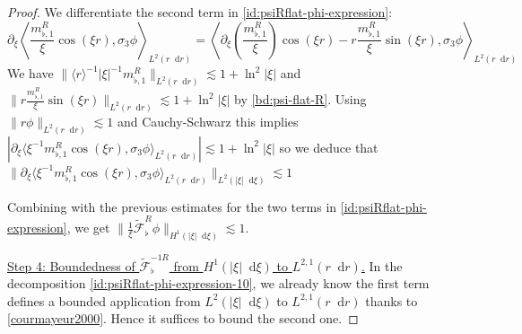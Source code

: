\documentclass[11 pt]{amsart}
\theoremstyle{definition}
\theoremstyle{remark}
\numberwithin{equation}{section}
\newcommand{\dd}{\mathop{}\!\mathrm{d}}
\begin{document}
\begin{proof}
We differentiate the second term in \eqref{id:psiRflat-phi-expression}:
$$
\partial_\xi \left\langle \frac{m_{\flat, 1}^R }{\xi} \cos (\xi r),\sigma_3 \phi\right\rangle_{L^2(r\dd r)}=\left\langle \partial_\xi \left( \frac{m_{\flat, 1}^R }{\xi}\right) \cos (\xi r)-r\frac{m_{\flat, 1}^R }{\xi} \sin (\xi r),\sigma_3 \phi\right\rangle_{L^2(r\dd r)}
$$
We have $\| \langle r \rangle^{-1}|\xi|^{-1}m_{\flat,1}^{R} \|_{L^2(r\dd r)}\lesssim 1+ \ln^2 |\xi|$ and $\| r\frac{m_{\flat, 1}^R }{\xi} \sin (\xi r) \|_{L^2(r\dd r)}\lesssim 1+ \ln^2 |\xi|$ by \eqref{bd:psi-flat-R}. Using $\| r\phi\|_{L^2(r\dd r)}\lesssim 1$ and Cauchy-Schwarz this implies $|\partial_\xi \langle \xi^{-1}m_{\flat, 1}^R \cos (\xi r),\sigma_3 \phi \rangle_{L^2(r\dd r)}|\lesssim 1+\ln^2 |\xi|$ so we deduce that $\| \partial_\xi \langle \xi^{-1}m_{\flat, 1}^R \cos (\xi r),\sigma_3 \phi \rangle_{L^2(r\dd r)}\|_{L^2(|\xi|\dd\xi)}\lesssim 1$

Combining with the previous estimates for the two terms in \eqref{id:psiRflat-phi-expression}, we get $\|\frac{1}{\xi} \widetilde{\mathcal F}^R_\flat \phi\|_{H^1(|\xi|\dd \xi)}\lesssim 1$.


\medskip

\noindent \underline{Step 4: Boundedness of $\widetilde{\mathcal F}^{-1R}_\flat$ from $H^1(|\xi|\dd \xi)$ to $L^{2,1}(r\dd r)$.} In the decomposition \eqref{id:psiRflat-phi-expression-10}, we already know the first term defines a bounded application from $L^2(|\xi|\dd \xi)$ to $L^{2,1}(r\dd r)$ thanks to \eqref{courmayeur2000}. Hence it suffices to bound the second one.



\end{proof}
\end{document}

